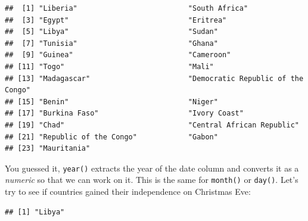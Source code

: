 \documentclass[]{gitbook}
\newenvironment{Shaded}{\begin{snugshade}}{\end{snugshade}}
\newcommand{\DecValTok}[1]{\textcolor[rgb]{0.00,0.00,0.81}{#1}}
\newcommand{\KeywordTok}[1]{\textcolor[rgb]{0.13,0.29,0.53}{\textbf{#1}}}
\newcommand{\NormalTok}[1]{#1}
\newcommand{\OperatorTok}[1]{\textcolor[rgb]{0.81,0.36,0.00}{\textbf{#1}}}
\newcommand{\StringTok}[1]{\textcolor[rgb]{0.31,0.60,0.02}{#1}}
\theoremstyle{definition}
\theoremstyle{definition}
\theoremstyle{definition}
\theoremstyle{remark}
\begin{document}
\begin{Shaded}
\end{Shaded}

\begin{verbatim}
##  [1] "Liberia"                          "South Africa"                    
##  [3] "Egypt"                            "Eritrea"                         
##  [5] "Libya"                            "Sudan"                           
##  [7] "Tunisia"                          "Ghana"                           
##  [9] "Guinea"                           "Cameroon"                        
## [11] "Togo"                             "Mali"                            
## [13] "Madagascar"                       "Democratic Republic of the Congo"
## [15] "Benin"                            "Niger"                           
## [17] "Burkina Faso"                     "Ivory Coast"                     
## [19] "Chad"                             "Central African Republic"        
## [21] "Republic of the Congo"            "Gabon"                           
## [23] "Mauritania"
\end{verbatim}

You guessed it, \texttt{year()} extracts the year of the date column and
converts it as a \emph{numeric} so that we can work on it. This is the
same for \texttt{month()} or \texttt{day()}. Let's try to see if
countries gained their independence on Christmas Eve:

\begin{Shaded}
\end{Shaded}

\begin{verbatim}
## [1] "Libya"
\end{verbatim}
\end{document}
